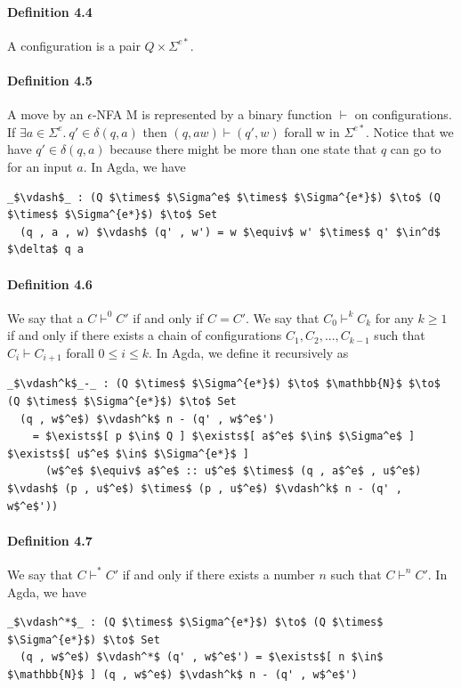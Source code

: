 \documentclass[twoside,openright,final]{bhamthesis}
\begin{document}
\paragraph{Definition 4.4} A configuration is a pair \(Q \times
\Sigma^{e*}\). 

\paragraph{Definition 4.5} A move by an \(\epsilon\)-NFA M is
represented by a binary function \(\vdash\) on configurations. If \(\exists a\in\Sigma^e.\ q' \in \delta (q , a)\)
then \((q, aw) \vdash (q' , w)\) forall w in \(\Sigma^{e*}\). Notice
that we have \(q' \in \delta (q , a)\) because there might be more
than one state that \(q\) can go to for an input \(a\). In Agda, we
have
\begin{lstlisting}[mathescape=true,aboveskip=0pt,belowskip=0pt]
  _$\vdash$_ : (Q $\times$ $\Sigma^e$ $\times$ $\Sigma^{e*}$) $\to$ (Q $\times$ $\Sigma^{e*}$) $\to$ Set
  (q , a , w) $\vdash$ (q' , w') = w $\equiv$ w' $\times$ q' $\in^d$ $\delta$ q a
\end{lstlisting}
\paragraph{Definition 4.6} We say that a \(C \vdash^0 C'\) if and only
if \(C = C'\). We say that \(C_0 \vdash^k C_k\) for any \(k \geq 1\) if and only if there exists a chain of
configurations \(C_1, C_2, ..., C_{k-1}\) such that \(C_i \vdash
C_{i+1}\) forall \(0 \leq i \leq k\). In Agda, we define it
recursively as
\begin{lstlisting}[mathescape=true,aboveskip=0pt,belowskip=0pt]
  _$\vdash^k$_-_ : (Q $\times$ $\Sigma^{e*}$) $\to$ $\mathbb{N}$ $\to$ (Q $\times$ $\Sigma^{e*}$) $\to$ Set
  (q , w$^e$) $\vdash^k$ n - (q' , w$^e$') 
    = $\exists$[ p $\in$ Q ] $\exists$[ a$^e$ $\in$ $\Sigma^e$ ] $\exists$[ u$^e$ $\in$ $\Sigma^{e*}$ ]
      (w$^e$ $\equiv$ a$^e$ :: u$^e$ $\times$ (q , a$^e$ , u$^e$) $\vdash$ (p , u$^e$) $\times$ (p , u$^e$) $\vdash^k$ n - (q' , w$^e$'))
\end{lstlisting}

\paragraph{Definition 4.7} We say that \(C \vdash^* C'\) if and only
if there exists a number \(n\) such that \(C \vdash^n C'\). In Agda,
we have
\begin{lstlisting}[mathescape=true,aboveskip=0pt,belowskip=0pt]
  _$\vdash^*$_ : (Q $\times$ $\Sigma^{e*}$) $\to$ (Q $\times$ $\Sigma^{e*}$) $\to$ Set
  (q , w$^e$) $\vdash^*$ (q' , w$^e$') = $\exists$[ n $\in$ $\mathbb{N}$ ] (q , w$^e$) $\vdash^k$ n - (q' , w$^e$')
\end{lstlisting}
\end{document}
